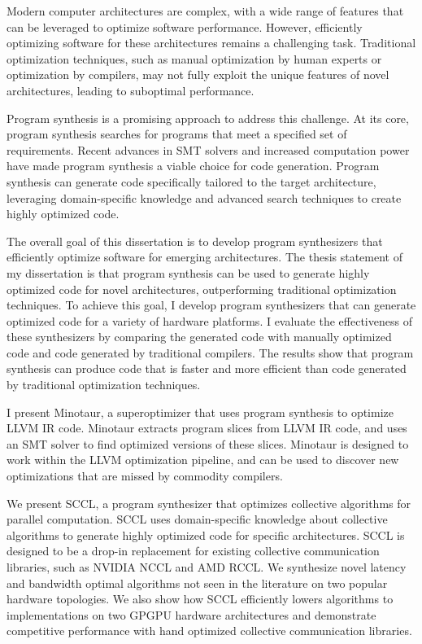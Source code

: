 Modern computer architectures are complex, with a wide range of
features that can be leveraged to optimize software performance.
However, efficiently optimizing software for these architectures
remains a challenging task. Traditional optimization techniques,
such as manual optimization by human experts or optimization by
compilers, may not fully exploit the unique features of novel
architectures, leading to suboptimal performance.

Program synthesis is a promising approach to address this challenge.
At its core, program synthesis searches for programs that meet a
specified set of requirements. Recent advances in SMT solvers and
increased computation power have made program synthesis a viable
choice for code generation. Program synthesis can generate code
specifically tailored to the target architecture, leveraging
domain-specific knowledge and advanced search techniques to create
highly optimized code.

The overall goal of this dissertation is to develop program
synthesizers that efficiently optimize software for emerging
architectures. The thesis statement of my dissertation is that program
synthesis can be used to generate highly optimized code for novel
architectures, outperforming traditional optimization techniques. To
achieve this goal, I develop program synthesizers that can
generate optimized code for a variety of hardware platforms. I
evaluate the effectiveness of these synthesizers by comparing the
generated code with manually optimized code and code generated by
traditional compilers. The results show that program synthesis can
produce code that is faster and more efficient than code generated by
traditional optimization techniques.

I present Minotaur, a superoptimizer that uses program synthesis
to optimize LLVM IR code. Minotaur extracts program slices from LLVM IR
code, and uses an SMT solver to find optimized versions of these slices.
Minotaur is designed to work within the LLVM optimization pipeline, and
can be used to discover new optimizations that are missed by commodity
compilers.

We present SCCL, a program synthesizer that optimizes collective
algorithms for parallel computation. SCCL uses domain-specific knowledge
about collective algorithms to generate highly optimized code for
specific architectures. SCCL is designed to be a drop-in replacement for
existing collective communication libraries, such as NVIDIA NCCL and AMD RCCL.
We synthesize novel latency and bandwidth optimal algorithms not seen
in the literature on two popular hardware topologies. We also show how
SCCL efficiently lowers algorithms to implementations on two GPGPU
hardware architectures and demonstrate competitive performance with
hand optimized collective communication libraries.